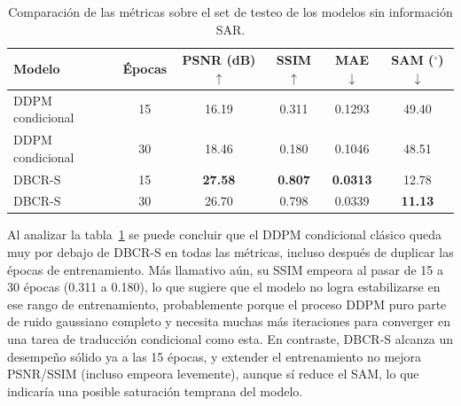\begin{table}[H]
    \centering
    \begin{tabular}{lccccc}
        \hline
        \textbf{Modelo} & \textbf{Épocas} & \textbf{PSNR (dB)$\uparrow$} & \textbf{SSIM$\uparrow$} & \textbf{MAE$\downarrow$} & \textbf{SAM ($^\circ$)$\downarrow$} \\
        \hline
        DDPM condicional & 15 & 16.19 & 0.311 & 0.1293 & 49.40 \\
        DDPM condicional & 30 & 18.46 & 0.180 & 0.1046 & 48.51 \\
        DBCR-S            & 15 & \textbf{27.58} & \textbf{0.807} & \textbf{0.0313} & 12.78 \\
        DBCR-S            & 30 & 26.70 & 0.798 & 0.0339 & \textbf{11.13} \\
        \hline
    \end{tabular}
    \caption{Comparación de las métricas sobre el set de testeo de los modelos sin información SAR.}
    \label{tab:sin_sar}
\end{table}

Al analizar la tabla~\ref{tab:sin_sar} se puede concluir que el DDPM condicional clásico queda muy por debajo de DBCR-S en todas las métricas, incluso después de duplicar las épocas de entrenamiento. Más llamativo aún, su SSIM empeora al pasar de 15 a 30 épocas (0.311 a 0.180), lo que sugiere que el modelo no logra estabilizarse en ese rango de entrenamiento, probablemente porque el proceso DDPM puro parte de ruido gaussiano completo y necesita muchas más iteraciones para converger en una tarea de traducción condicional como esta. En contraste, DBCR-S alcanza un desempeño sólido ya a las 15 épocas, y extender el entrenamiento no mejora PSNR/SSIM (incluso empeora levemente), aunque sí reduce el SAM, lo que indicaría una posible saturación temprana del modelo.


